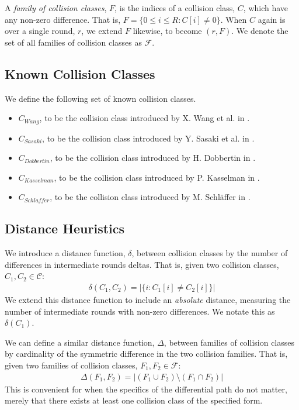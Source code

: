 \documentclass[conference]{IEEEtran}
\begin{document}
A \textit{family of collision classes}, $F$, is the indices of a
collision class, $C$, which have any non-zero difference. That is,
$F = \{ 0 \leq i \leq R : C[i] \neq 0 \}$. When $C$ again is over
a single round, $r$, we extend $F$ likewise, to become
$(r, F)$. We denote the set of all families of collision classes as
$\mathcal{F}$.

\subsection{Known Collision Classes}

We define the following set of known collision classes.

\begin{itemize}
    \item $C_{Wang}$, to be the collision class introduced by X. Wang
        et al. in \cite{Wang2005}.
    \item $C_{Sasaki}$, to be the collision class introduced by Y. Sasaki
        et al. in \cite{Sasaki2007}.
    \item $C_{Dobbertin}$, to be the collision class introduced by
        H. Dobbertin in \cite{Dobbertin1998}.
    \item $C_{Kasselman}$, to be the collision class introduced by
        P. Kasselman in \cite{KasselmanMD4}.
    \item $C_{Schlaffer}$, to be the collision class introduced by
        M. Schl{\"a}ffer in \cite{Schlaffer2006}.
\end{itemize}

\subsection{Distance Heuristics} \label{terminology:distance}

We introduce a distance function, $\delta$, between collision classes by the
number of differences in intermediate rounds deltas. That is, given two
collision classes, $C_1, C_2 \in \mathcal{C}$:
\begin{align}
    \delta(C_1, C_2) = \big| \{ i : C_1[i] \neq C_2[i] \} \big|
\end{align}
We extend this distance function to include an \textit{absolute} distance,
measuring the number of intermediate rounds with non-zero differences.
We notate this as $\delta(C_1)$.

We can define a similar distance function, $\Delta$, between families of
collision classes by cardinality of the symmetric difference in the two
collision families. That is, given two families of collision classes,
$F_1, F_2 \in \mathcal{F}$:
\begin{align}
    \Delta(F_1, F_2) = \big| (F_1 \cup F_2) \setminus (F_1 \cap F_2) \big|
\end{align}
This is convenient for when the specifics of the differential path do not
matter, merely that there exists at least one collision class of the specified
form.
\end{document}
